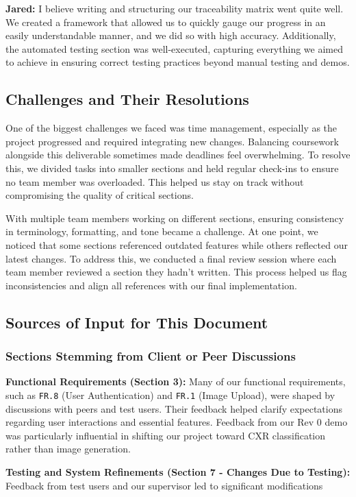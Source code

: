\documentclass[12pt, titlepage]{article}
\begin{document}
\begin{enumerate}
  \textbf{Jared:} I believe writing and structuring our traceability matrix went quite well. We created a framework that allowed us to quickly gauge our progress in an easily understandable manner, and we did so with high accuracy. Additionally, the automated testing section was well-executed, capturing everything we aimed to achieve in ensuring correct testing practices beyond manual testing and demos.
  
  \subsection{Challenges and Their Resolutions}
  
  One of the biggest challenges we faced was time management, especially as the project progressed and required integrating new changes. Balancing coursework alongside this deliverable sometimes made deadlines feel overwhelming. To resolve this, we divided tasks into smaller sections and held regular check-ins to ensure no team member was overloaded. This helped us stay on track without compromising the quality of critical sections.
  
  With multiple team members working on different sections, ensuring consistency in terminology, formatting, and tone became a challenge. At one point, we noticed that some sections referenced outdated features while others reflected our latest changes. To address this, we conducted a final review session where each team member reviewed a section they hadn't written. This process helped us flag inconsistencies and align all references with our final implementation.
  
  \subsection{Sources of Input for This Document}
  
  \subsubsection{Sections Stemming from Client or Peer Discussions}
  
  \textbf{Functional Requirements (Section 3):} Many of our functional requirements, such as \texttt{FR.8} (User Authentication) and \texttt{FR.1} (Image Upload), were shaped by discussions with peers and test users. Their feedback helped clarify expectations regarding user interactions and essential features. Feedback from our Rev 0 demo was particularly influential in shifting our project toward CXR classification rather than image generation.
  
  \textbf{Testing and System Refinements (Section 7 - Changes Due to Testing):} Feedback from test users and our supervisor led to significant modifications 
  
  

\end{enumerate}
\end{document}
